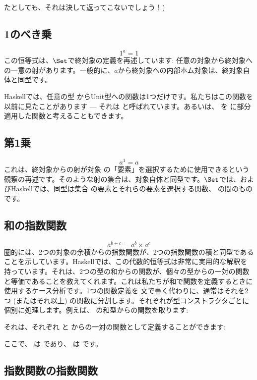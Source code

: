 たとしても、それは決して返ってこないでしょう！) 

\subsection{1のべき乗}

\[1^{a} = 1\]
この恒等式は、$\Set$で終対象の定義を再述しています: 任意の対象から終対象への一意の射があります。一般的に、$a$から終対象への内部ホム対象は、終対象自体と同型です。

Haskellでは、任意の型  からUnit型への関数は1つだけです。私たちはこの関数を以前に見たことがあります --- それは  と呼ばれています。あるいは、 を \code{()} に部分適用した関数と考えることもできます。

\subsection{第1乗}

\[a^{1} = a\]
これは、終対象からの射が対象  の「要素」を選択するために使用できるという観察の再述です。そのような射の集合は、対象自体と同型です。$\Set$では、およびHaskellでは、同型は集合  の要素とそれらの要素を選択する関数、 の間のものです。

\subsection{和の指数関数}

\[a^{b+c} = a^{b} \times a^{c}\]
圏的には、2つの対象の余積からの指数関数が、2つの指数関数の積と同型であることを示しています。Haskellでは、この代数的恒等式は非常に実用的な解釈を持っています。それは、2つの型の和からの関数が、個々の型からの一対の関数と等価であることを教えてくれます。これは私たちが和で関数を定義するときに使用するケース分析です。1つの関数定義を  文で書く代わりに、通常はそれを2つ (またはそれ以上) の関数に分割します。それぞれが型コンストラクタごとに個別に処理します。例えば、 の和型からの関数を取ります: 

それは、それぞれ  と  からの一対の関数として定義することができます: 

ここで、 は  であり、 は  です。

\subsection{指数関数の指数関数}

